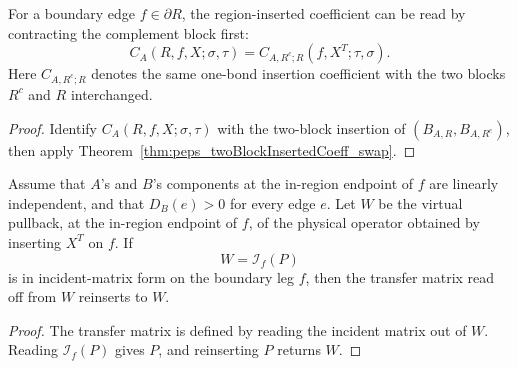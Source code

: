 \begin{theorem}
    \label{thm:peps_regionInsertedCoeff_complement_reading}
    \leanok
    For a boundary edge \(f\in\partial R\), the region-inserted coefficient can be
    read by contracting the complement block first:
    \[
        C_A(R,f,X;\sigma,\tau)
        =
        C_{A,R^c;R}(f,X^T;\tau,\sigma).
    \]
    Here \(C_{A,R^c;R}\) denotes the same one-bond insertion coefficient with the
    two blocks \(R^c\) and \(R\) interchanged.
\end{theorem}
\begin{proof}\leanok
    Identify \(C_A(R,f,X;\sigma,\tau)\) with the two-block insertion of
    \((B_{A,R},B_{A,R^c})\), then apply
    Theorem~\ref{thm:peps_twoBlockInsertedCoeff_swap}.
\end{proof}

\begin{theorem}
    \label{thm:peps_hform_of_region_incident_form}
    \leanok
    Assume that \(A\)'s and \(B\)'s components at the in-region endpoint of \(f\)
    are linearly independent, and that \(D_B(e)>0\) for every edge \(e\).
    Let \(W\) be the virtual pullback, at the in-region endpoint of \(f\), of the
    physical operator obtained by inserting \(X^T\) on \(f\).  If
    \[
        W=\mathcal I_f(P)
    \]
    is in incident-matrix form on the boundary leg \(f\), then the transfer matrix
    read off from \(W\) reinserts to \(W\).
\end{theorem}
\begin{proof}\leanok
    The transfer matrix is defined by reading the incident matrix out of \(W\).
    Reading \(\mathcal I_f(P)\) gives \(P\), and reinserting \(P\) returns \(W\).
\end{proof}

